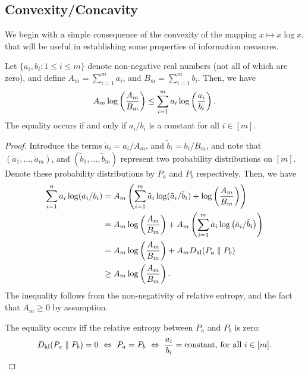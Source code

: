             
            \subsection{Convexity/Concavity}
           
            We begin with a simple consequence of the convexity of the mapping $x \mapsto x \log x$, that will be useful in establishing some properties of information measures. 
                \begin{proposition}
                    \label{prop:log-sum}                    
                    Let $\{a_i, b_i: 1 \leq i \leq m\}$ denote non-negative real numbers (not all of which are zero), and define $A_m = \sum_{i=1}^m a_i$, and $B_m = \sum_{i=1}^m b_i$. Then, we have 
                    \begin{align}
                        A_m \log \left( \frac{A_m}{B_m} \right) \leq \sum_{i=1}^m a_i \log\left( \frac{a_i}{b_i} \right).  
                    \end{align}
                    The equality occurs if and only if $a_i/b_i$ is a constant for all $i \in [m]$. 
                \end{proposition}
                \begin{proof}
                    Introduce the terms $\tilde{a}_i = a_i/A_m$, and $\tilde{b}_i = b_i/B_m$, and note that $(\tilde{a}_1, \ldots, \tilde{a}_m)$, and $(\tilde{b}_1, \ldots, \tilde{b}_m)$ represent two probability distributions on $[m]$. Denote these probability distributions by $P_a$ and $P_b$ respectively. Then, we have 
                    \begin{align}
                        \sum_{i=1}^n a_i \log (a_i/b_i) &= A_m \left( \sum_{i=1}^m \tilde{a}_i \log (\tilde{a}_i/\tilde{b}_i) + \log\left( \frac{A_m}{B_m} \right)  \right) \\
                        & = A_m \log \left( \frac{A_m}{B_m} \right)  + A_m \left( \sum_{i=1}^m \tilde{a}_i \log \left( \tilde{a}_i/\tilde{b}_i \right) \right)  \\
                        & = A_m \log \left( \frac{A_m}{B_m} \right)  + A_m D_{\text{kl}}(P_a \parallel P_b)\\
                        & \geq A_m \log \left( \frac{A_m}{B_m} \right). 
                    \end{align}
                    The inequality follows from the non-negativity of relative entropy, and the fact that $A_m \geq 0$ by assumption. 

                    The equality occurs iff the relative entropy between $P_a$ and $P_b$ is zero: 
                    \begin{align}
                        D_{\text{kl}}(P_a \parallel P_b) = 0 ~\Leftrightarrow~ P_a = P_b ~\Leftrightarrow~ \frac{a_i}{b_i} = \text{constant, for all } i \in [m]. 
                    \end{align}
                \end{proof}
